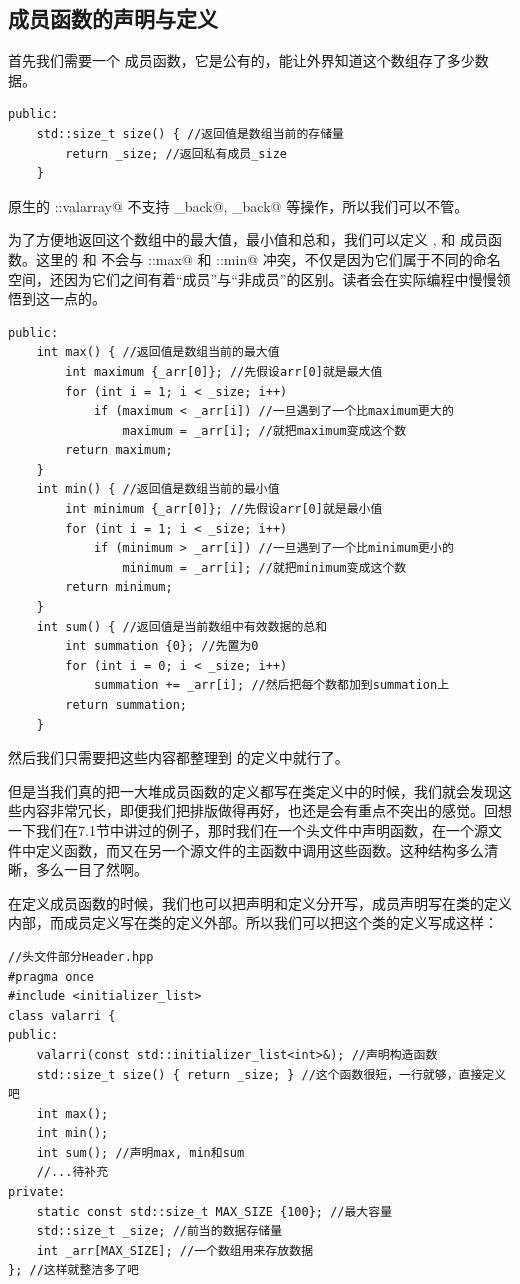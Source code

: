 \subsection*{成员函数的声明与定义}
首先我们需要一个 \lstinline@size@ 成员函数，它是公有的，能让外界知道这个数组存了多少数据。
\begin{lstlisting}
public:
    std::size_t size() { //返回值是数组当前的存储量
        return _size; //返回私有成员_size
    }
\end{lstlisting}\par
原生的 \lstinline@std::valarray@ 不支持 \lstinline@push_back@, \lstinline@pop_back@ 等操作，所以我们可以不管。\par
为了方便地返回这个数组中的最大值，最小值和总和，我们可以定义 \lstinline@max@, \lstinline@min@ 和 \lstinline@sum@ 成员函数。这里的 \lstinline@max@ 和 \lstinline@min@ 不会与 \lstinline@std::max@ 和 \lstinline@std::min@ 冲突，不仅是因为它们属于不同的命名空间，还因为它们之间有着``成员''与``非成员''的区别。读者会在实际编程中慢慢领悟到这一点的。
\begin{lstlisting}
public:
    int max() { //返回值是数组当前的最大值
        int maximum {_arr[0]}; //先假设arr[0]就是最大值
        for (int i = 1; i < _size; i++)
            if (maximum < _arr[i]) //一旦遇到了一个比maximum更大的
                maximum = _arr[i]; //就把maximum变成这个数
        return maximum;
    }
    int min() { //返回值是数组当前的最小值
        int minimum {_arr[0]}; //先假设arr[0]就是最小值
        for (int i = 1; i < _size; i++)
            if (minimum > _arr[i]) //一旦遇到了一个比minimum更小的
                minimum = _arr[i]; //就把minimum变成这个数
        return minimum;
    }
    int sum() { //返回值是当前数组中有效数据的总和
        int summation {0}; //先置为0
        for (int i = 0; i < _size; i++)
            summation += _arr[i]; //然后把每个数都加到summation上
        return summation;
    }
\end{lstlisting}
然后我们只需要把这些内容都整理到 \lstinline@valarri@ 的定义中就行了。\par
但是当我们真的把一大堆成员函数的定义都写在类定义中的时候，我们就会发现这些内容非常冗长，即便我们把排版做得再好，也还是会有重点不突出的感觉。回想一下我们在7.1节中讲过的例子，那时我们在一个头文件中声明函数，在一个源文件中定义函数，而又在另一个源文件的主函数中调用这些函数。这种结构多么清晰，多么一目了然啊。\par
在定义成员函数的时候，我们也可以把声明和定义分开写，成员声明写在类的定义内部，而成员定义写在类的定义外部。所以我们可以把这个类的定义写成这样：
\begin{lstlisting}
//头文件部分Header.hpp
#pragma once
#include <initializer_list>
class valarri {
public:
    valarri(const std::initializer_list<int>&); //声明构造函数
    std::size_t size() { return _size; } //这个函数很短，一行就够，直接定义吧
    int max();
    int min();
    int sum(); //声明max, min和sum
    //...待补充
private:
    static const std::size_t MAX_SIZE {100}; //最大容量
    std::size_t _size; //前当的数据存储量
    int _arr[MAX_SIZE]; //一个数组用来存放数据
}; //这样就整洁多了吧
\end{lstlisting}
